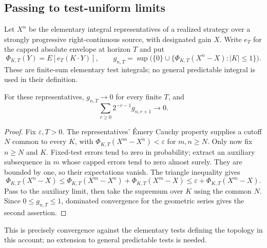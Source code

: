 \subsection{Passing to test-uniform limits}
Let $X^n$ be the elementary integral representatives of a realized strategy
over a strongly progressive right-continuous source, with designated gain $X$.
Write $e_T$ for the capped absolute envelope at horizon $T$ and put
\[
 \Phi_{K,T}(Y)=E[e_T(K\cdot Y)],\qquad
 g_{n,T}=\sup\bigl(\{0\}\cup\{\Phi_{K,T}(X^n-X):|K|\leq1\}\bigr).
\]
These are finite-sum elementary test integrals; no general predictable
integral is used in their definition.
\begin{lemma}
For these representatives, $g_{n,T}\to0$ for every finite $T$, and
\[
 \sum_{r\geq0}2^{-r-1}g_{n,r+1}\longrightarrow0.
\]
\end{lemma}
\begin{proof}
Fix $\varepsilon,T>0$. The representatives' Émery Cauchy property supplies a
cutoff $N$ common to every $K$, with
$\Phi_{K,T}(X^m-X^n)<\varepsilon$ for $m,n\geq N$.
Only now fix $n\geq N$ and $K$. Fixed-test errors tend to zero in probability;
extract an auxiliary subsequence in $m$ whose capped errors tend to zero
almost surely. They are bounded by one, so their expectations vanish.
The triangle inequality gives
\[
 \Phi_{K,T}(X^n-X)\leq
 \Phi_{K,T}(X^m-X^n)+\Phi_{K,T}(X^m-X)
 \leq\varepsilon+\Phi_{K,T}(X^m-X).
\]
Pass to the auxiliary limit, then take the supremum over $K$ using the common
$N$. Since $0\leq g_{n,T}\leq1$, dominated convergence for the geometric
series gives the second assertion.
\end{proof}
This is precisely convergence against the elementary tests defining the
topology in this account; no extension to general predictable tests is needed.
